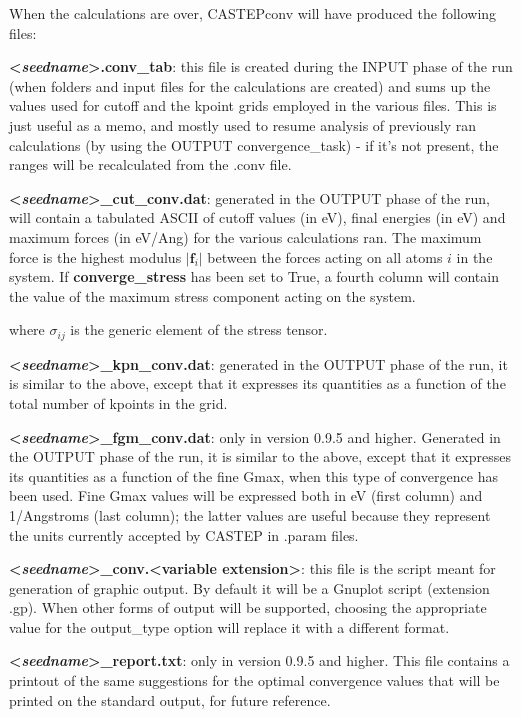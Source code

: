 \documentclass[10pt]{article}
\begin{document}
When the calculations are over, CASTEPconv will have produced the following 
files:

\textbf{\textless \textit{seedname}\textgreater.conv\_tab}: this file is created 
during the INPUT phase of the run (when folders and input files for the 
calculations are created) and sums up the values used for cutoff and the kpoint 
grids employed in the various files. This is just useful as a memo, and mostly 
used to resume analysis of previously ran calculations (by using the OUTPUT 
convergence\_task) - if it's not present, the ranges will be recalculated from 
the .conv file.

\textbf{\textless \textit{seedname}\textgreater\_cut\_conv.dat}: generated in 
the OUTPUT phase of the run, will contain a tabulated ASCII of cutoff values (in 
eV), final energies (in eV) and maximum forces (in eV/Ang) for the various 
calculations ran. The maximum force is the highest modulus $|\mathbf{f}_i|$ 
between the forces acting on all atoms $i$ in the system. If 
\textbf{converge\_stress} has been set to True, a fourth column will contain the 
value of the maximum stress component acting on the system.

where $\sigma_{ij}$ is the generic element of the stress tensor.

\textbf{\textless \textit{seedname}\textgreater\_kpn\_conv.dat}: generated in 
the OUTPUT phase of the run, it is similar to the above, except that it 
expresses its quantities as a function of the total number of kpoints in the 
grid.

\textbf{\textless \textit{seedname}\textgreater\_fgm\_conv.dat}: only in version 0.9.5 and higher. Generated in 
the OUTPUT phase of the run, it is similar to the above, except that it 
expresses its quantities as a function of the fine Gmax, when this type of convergence has been used. Fine Gmax
values will be expressed both in eV (first column) and 1/Angstroms (last column); the latter values are useful
because they represent the units currently accepted by CASTEP in .param files.

\textbf{\textless \textit{seedname}\textgreater\_conv.\textless variable 
extension\textgreater}: this file is the script meant for generation of graphic 
output. By default it will be a Gnuplot script (extension .gp). When other forms 
of output will be supported, choosing the appropriate value for the output\_type 
option will replace it with a different format.

\textbf{\textless \textit{seedname}\textgreater\_report.txt}: only in version 0.9.5 and higher. This file contains a printout of the same suggestions for the optimal convergence values that will be printed on the standard output, for future reference.
\end{document}

